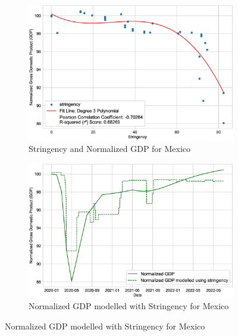 \documentclass[tikz,fleqn,12pt]{wlscirep}
\begin{document}
\begin{figure}[H]
  \begin{subfigure}[t]{0.48\textwidth}
    \centering
    \includegraphics[width=\linewidth]{images/stringency_vs_gdp_MEX.eps}
    \caption{Stringency and Normalized GDP for Mexico}
  \end{subfigure}
  \label{fig:stringency_vs_gdp_MEX}
  \hfill
  \begin{subfigure}[t]{0.48\textwidth}
    \centering
    \includegraphics[width=\linewidth]{images/gdp_modelled_with_stringency_MEX.eps}
    \caption{Normalized GDP modelled with Stringency for Mexico}
  \end{subfigure}
  \label{fig:gdp_modelled_with_stringency_MEX}


\end{figure}
\end{document}
